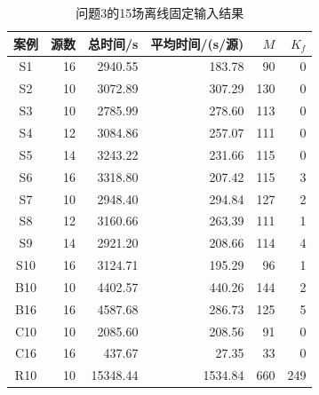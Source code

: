 \begin{table}[H]\centering\caption{问题3的15场离线固定输入结果}\label{tab:q3}
\small\setlength{\tabcolsep}{7pt}
\begin{tabular}{crrrrr}\toprule
案例 & 源数 & 总时间/s & 平均时间/(s/源) & $M$ & $K_f$\\\midrule
S1 & 16 & 2940.55 & 183.78 & 90 & 0\\
S2 & 10 & 3072.89 & 307.29 & 130 & 0\\
S3 & 10 & 2785.99 & 278.60 & 113 & 0\\
S4 & 12 & 3084.86 & 257.07 & 111 & 0\\
S5 & 14 & 3243.22 & 231.66 & 115 & 0\\
S6 & 16 & 3318.80 & 207.42 & 115 & 3\\
S7 & 10 & 2948.40 & 294.84 & 127 & 2\\
S8 & 12 & 3160.66 & 263.39 & 111 & 1\\
S9 & 14 & 2921.20 & 208.66 & 114 & 4\\
S10 & 16 & 3124.71 & 195.29 & 96 & 1\\
B10 & 10 & 4402.57 & 440.26 & 144 & 2\\
B16 & 16 & 4587.68 & 286.73 & 125 & 5\\
C10 & 10 & 2085.60 & 208.56 & 91 & 0\\
C16 & 16 & 437.67 & 27.35 & 33 & 0\\
R10 & 10 & 15348.44 & 1534.84 & 660 & 249\\
\bottomrule\end{tabular}
\end{table}
